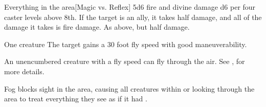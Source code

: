 \begin{spellheader}
    \spellrng{\rngclose}
\end{spellheader}
\begin{spelleffects}
    \begin{spelltarget}{Everything in the area}[Magic vs. Reflex]
        \spellsuccess 5d6 fire and divine damage \add d6 per four caster levels above 8th. If the target is an ally, it takes half damage, and all of the damage it takes is fire damage.
        \spellfailure As above, but half damage.
    \end{spelltarget}
\end{spelleffects}
\begin{spellfooter}
    \spellnotes \destructivespellnotes

    \firespellnotes
\end{spellfooter}

\begin{spellheader}
    \spellrng{\rngtouch}
    \spelldur{\durshort}
\end{spellheader}
\begin{spelleffects}
    \begin{spelltarget}{One creature}
        \spelleffect The target gains a 30 foot fly speed with good maneuverability.
    \end{spelltarget}
\end{spelleffects}
\begin{spellfooter}
    \spellnotes An unencumbered creature with a fly speed can fly through the air. See , for more details.

\end{spellfooter}%

\begin{spellheader}
    \spelldur{\durshort}
\end{spellheader}
\begin{spelleffects}
    \spellline
    \spelleffect Fog blocks sight in the area, causing all creatures within or looking through the area to treat everything they see as if it had \concealment.
\end{spelleffects}
\begin{spellfooter}
    \spellnotes \fogspellnotes \fogwindspellnotes
\end{spellfooter}

